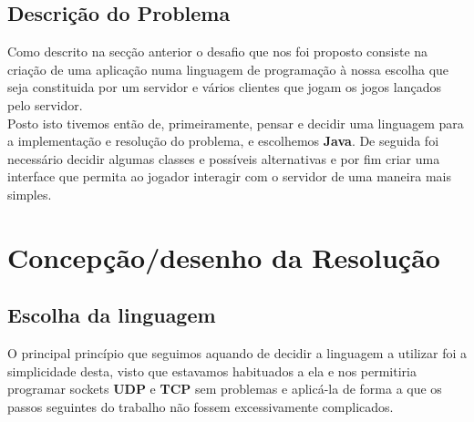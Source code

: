 \documentclass{report}
\begin{document}
\section{Descrição do Problema}\label{descricao}
Como descrito na secção anterior o desafio que nos foi proposto consiste na criação de uma aplicação numa linguagem de programação à nossa escolha que seja constituida por um servidor e vários clientes que jogam os jogos lançados pelo servidor. \\
Posto isto tivemos então de, primeiramente, pensar e decidir uma linguagem para a implementação e resolução do problema, e escolhemos \textbf{Java}. De seguida foi necessário decidir algumas classes e possíveis alternativas e por fim criar uma interface que permita ao jogador interagir com o servidor de uma maneira mais simples.

\chapter{Concepção/desenho da Resolução}\label{concepcao}

\section{Escolha da linguagem}\label{linguagem}
O principal princípio que seguimos aquando de decidir a linguagem a utilizar foi a simplicidade desta, visto que estavamos habituados a ela e nos permitiria programar sockets \textbf{UDP} e \textbf{TCP} sem problemas e aplicá-la de forma a que os passos seguintes do trabalho não fossem excessivamente complicados.
\end{document}
